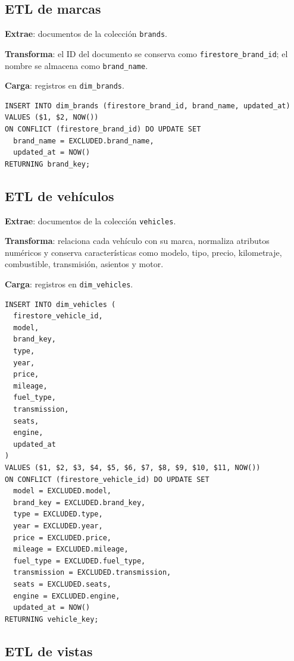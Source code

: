 \documentclass[12pt,letterpaper]{article}
\begin{document}
\subsection{ETL de marcas}

\textbf{Extrae}: documentos de la colección \texttt{brands}.

\textbf{Transforma}: el ID del documento se conserva como \texttt{firestore\_brand\_id}; el nombre se almacena como \texttt{brand\_name}.

\textbf{Carga}: registros en \texttt{dim\_brands}.

\begin{lstlisting}[style=sqlstyle,caption={Carga de marcas}]
INSERT INTO dim_brands (firestore_brand_id, brand_name, updated_at)
VALUES ($1, $2, NOW())
ON CONFLICT (firestore_brand_id) DO UPDATE SET
  brand_name = EXCLUDED.brand_name,
  updated_at = NOW()
RETURNING brand_key;
\end{lstlisting}

\subsection{ETL de vehículos}

\textbf{Extrae}: documentos de la colección \texttt{vehicles}.

\textbf{Transforma}: relaciona cada vehículo con su marca, normaliza atributos numéricos y conserva características como modelo, tipo, precio, kilometraje, combustible, transmisión, asientos y motor.

\textbf{Carga}: registros en \texttt{dim\_vehicles}.

\begin{lstlisting}[style=sqlstyle,caption={Carga de vehículos}]
INSERT INTO dim_vehicles (
  firestore_vehicle_id,
  model,
  brand_key,
  type,
  year,
  price,
  mileage,
  fuel_type,
  transmission,
  seats,
  engine,
  updated_at
)
VALUES ($1, $2, $3, $4, $5, $6, $7, $8, $9, $10, $11, NOW())
ON CONFLICT (firestore_vehicle_id) DO UPDATE SET
  model = EXCLUDED.model,
  brand_key = EXCLUDED.brand_key,
  type = EXCLUDED.type,
  year = EXCLUDED.year,
  price = EXCLUDED.price,
  mileage = EXCLUDED.mileage,
  fuel_type = EXCLUDED.fuel_type,
  transmission = EXCLUDED.transmission,
  seats = EXCLUDED.seats,
  engine = EXCLUDED.engine,
  updated_at = NOW()
RETURNING vehicle_key;
\end{lstlisting}

\subsection{ETL de vistas}
\end{document}
